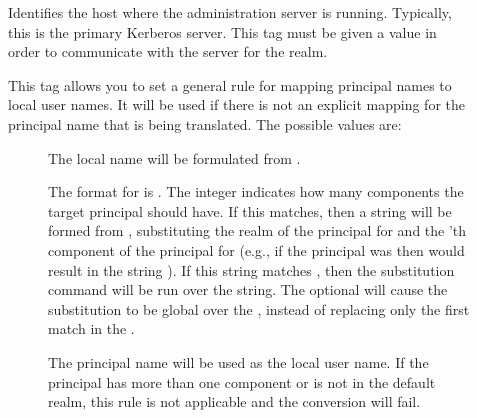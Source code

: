 \documentclass[letterpaper,10pt,english]{sphinxmanual}
\begin{document}
\begin{description}
\item[{}] \leavevmode
Identifies the host where the administration server is running.
Typically, this is the primary Kerberos server.  This tag must be
given a value in order to communicate with the {\hyperref[\detokenize{admin/admin_commands/kadmind:kadmind-8}]{}}
server for the realm.

\item[{}] \leavevmode
This tag allows you to set a general rule for mapping principal
names to local user names.  It will be used if there is not an
explicit mapping for the principal name that is being
translated. The possible values are:
\begin{description}
\item[{}] \leavevmode
The local name will be formulated from .

The format for  is \sphinxstylestrong{{[}}\sphinxstylestrong{:}\sphinxstylestrong{{]}(}\sphinxstylestrong{/}.
The integer  indicates how many components the target
principal should have.  If this matches, then a string will be
formed from , substituting the realm of the principal
for  and the ’th component of the principal for
 (e.g., if the principal was  then
\sphinxcode{{[}2:\$2\$1foo{]}} would result in the string
).  If this string matches , then
the  substitution command will be run over the
string.  The optional  will cause the substitution to be
global over the , instead of replacing only the first
match in the .

\item[{}] \leavevmode
The principal name will be used as the local user name.  If
the principal has more than one component or is not in the
default realm, this rule is not applicable and the conversion
will fail.

\end{description}


\end{description}
\end{document}
